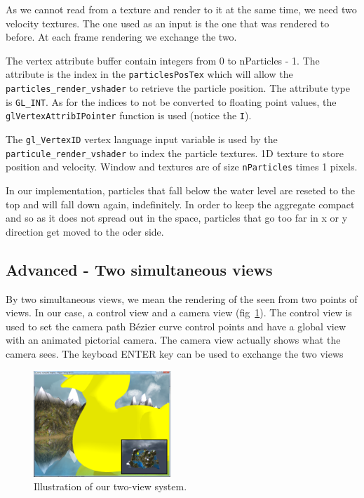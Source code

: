 \documentclass[a4paper,11pt]{article}
\begin{document}
As we cannot read from a texture and render to it at the same time, we need two velocity textures. The one used as an input is the one that was rendered to before. At each frame rendering we exchange the two.

The vertex attribute buffer contain integers from 0 to nParticles - 1. The attribute is the index in the \texttt{particlesPosTex} which will allow the \texttt{particles\_render\_vshader} to retrieve the particle position. The attribute type is \texttt{GL\_INT}. As for the indices to not be converted to floating point values, the \texttt{glVertexAttribIPointer} function is used (notice the \texttt{I}).

The \texttt{gl\_VertexID} vertex language input variable is used by the \texttt{particule\_render\_vshader} to index the particle textures.
1D texture to store position and velocity.
Window and textures are of size \texttt{nParticles} times 1 pixels.

In our implementation, particles that fall below the water level are reseted to the top and will fall down again, indefinitely. In order to keep the aggregate compact and so as it does not spread out in the space, particles that go too far in x or y direction get moved to the oder side.


\subsection{Advanced - Two simultaneous views}

By two simultaneous views, we mean the rendering of the seen from two points of views. In our case, a control view and a camera view (fig~\ref{two_views}). The control view is used to set the camera path Bézier curve control points and have a global view with an animated pictorial camera. The camera view actually shows what the camera sees. The keyboad ENTER key can be used to exchange the two views

\begin{figure}
\centering
\includegraphics[height=4cm]{img_stage3/two_views}
\caption{Illustration of our two-view system.}
\label{two_views}
\end{figure}
\end{document}

